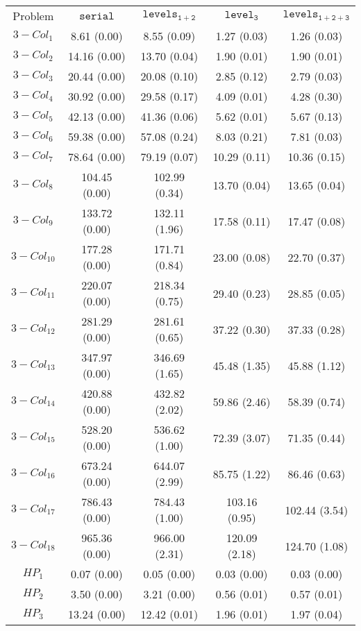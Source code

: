 \documentclass[preprint]{tlp}
\newcommand{\serial}{\ensuremath{\mathtt{serial}}\xspace}
\newcommand{\kali}{\ensuremath{\mathtt{levels_{1\!+\!2}}}\xspace}
\newcommand{\splitonly}{\ensuremath{\mathtt{level_3}}\xspace}
\newcommand{\paral}{\ensuremath{\mathtt{levels_{1\!+\!2\!+\!3}}}\xspace}
\begin{document}
\begin{table}[b!]
{
\begin{tabular}{| c | c | c | c | c |}
\cline{1-5}
Problem & \serial & \kali & \splitonly & \paral \\
\cline{1-5}
$3-Col_1$ & 8.61 (0.00) & 8.55 (0.09) & 1.27 (0.03) & 1.26 (0.03) \\
$3-Col_2$ & 14.16 (0.00) & 13.70 (0.04) & 1.90 (0.01) & 1.90 (0.01) \\
$3-Col_3$ & 20.44 (0.00) & 20.08 (0.10) & 2.85 (0.12) & 2.79 (0.03) \\
$3-Col_4$ & 30.92 (0.00) & 29.58 (0.17) & 4.09 (0.01) & 4.28 (0.30) \\
$3-Col_5$ & 42.13 (0.00) & 41.36 (0.06) & 5.62 (0.01) & 5.67 (0.13) \\
$3-Col_6$ & 59.38 (0.00) & 57.08 (0.24) & 8.03 (0.21) & 7.81 (0.03) \\
$3-Col_7$ & 78.64 (0.00) & 79.19 (0.07) & 10.29 (0.11) & 10.36 (0.15) \\
$3-Col_8$ & 104.45 (0.00) & 102.99 (0.34) & 13.70 (0.04) & 13.65 (0.04) \\
$3-Col_9$ & 133.72 (0.00) & 132.11 (1.96) & 17.58 (0.11) & 17.47 (0.08) \\
$3-Col_{10}$ & 177.28 (0.00) & 171.71 (0.84) & 23.00 (0.08) & 22.70 (0.37) \\
$3-Col_{11}$ & 220.07 (0.00) & 218.34 (0.75) & 29.40 (0.23) & 28.85 (0.05) \\
$3-Col_{12}$ & 281.29 (0.00) & 281.61 (0.65) & 37.22 (0.30) & 37.33 (0.28) \\
$3-Col_{13}$ & 347.97 (0.00) & 346.69 (1.65) & 45.48 (1.35) & 45.88 (1.12) \\
$3-Col_{14}$ & 420.88 (0.00) & 432.82 (2.02) & 59.86 (2.46) & 58.39 (0.74) \\
$3-Col_{15}$ & 528.20 (0.00) & 536.62 (1.00) & 72.39 (3.07) & 71.35 (0.44) \\
$3-Col_{16}$ & 673.24 (0.00) & 644.07 (2.99) & 85.75 (1.22) & 86.46 (0.63) \\
$3-Col_{17}$ & 786.43 (0.00) & 784.43 (1.00) & 103.16 (0.95) & 102.44 (3.54) \\
$3-Col_{18}$ & 965.36 (0.00) & 966.00 (2.31) & 120.09 (2.18) & 124.70 (1.08) \\
\cline{1-5}
$HP_1$ & 0.07 (0.00) & 0.05 (0.00) & 0.03 (0.00) & 0.03 (0.00) \\ 
$HP_2$ & 3.50 (0.00) & 3.21 (0.00) & 0.56 (0.01) & 0.57 (0.01) \\ 
$HP_3$ & 13.24 (0.00) & 12.42 (0.01) & 1.96 (0.01) & 1.97 (0.04) \\ 

\end{tabular}}
\end{table}
\end{document}
